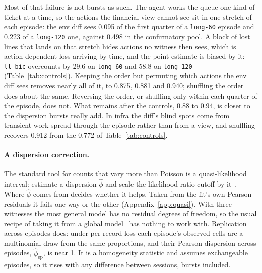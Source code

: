 \documentclass[11pt]{article}
\begin{document}
\begin{table}[h]
\centering

\caption{Loss in blocks of consecutive actions, exact matching.}
\label{tab:bursts}
\end{table}

Most of that failure is not bursts as such. The agent works the queue one kind of
ticket at a time, so the actions the financial view cannot see sit in one stretch
of each episode: the env diff sees 0.095 of the first quarter of a
\texttt{long-60} episode and 0.223 of a \texttt{long-120} one, against 0.498 in
the confirmatory pool. A block of lost lines that lands on that stretch hides
actions no witness then sees, which is action-dependent loss arriving by time,
and the point estimate is biased by it: \texttt{ll\_bic} overcounts by 29.6 on
\texttt{long-60} and 58.8 on \texttt{long-120} (Table~\ref{tab:controls}).
Keeping the order but permuting which actions the env diff sees removes nearly
all of it, to 0.875, 0.881 and 0.940; shuffling the order does about the same.
Reversing the order, or shuffling only within each quarter of the episode, does
not. What remains after the controls, 0.88 to 0.94, is closer to the dispersion
bursts really add. In infra the diff's blind spots come from transient work spread
through the episode rather than from a view, and shuffling recovers 0.912 from the
0.772 of Table~\ref{tab:controls}.

\begin{table}[h]
\centering

\caption{What makes block loss fail, on its own loss seeds (Table~\ref{tab:burstseeds}).
Post hoc.}
\label{tab:controls}
\end{table}

\paragraph{A dispersion correction.}
The standard tool for counts that vary more than Poisson is a quasi-likelihood
interval: estimate a dispersion $\hat\phi$ and scale the likelihood-ratio cutoff
by it~\citep{wedderburn1974quasi,mccullagh1989glm}. Where $\hat\phi$ comes from
decides whether it helps. Taken from the fit's own Pearson residuals it fails one
way or the other (Appendix~\ref{app:quasi}). With three witnesses the most
general model has no residual degrees of freedom, so the usual recipe of taking
it from a global model~\citep{lebreton1992marked,burnham2002model} has nothing to
work with. Replication across episodes does: under per-record loss each episode's
observed cells are a multinomial draw from the same proportions, and their
Pearson dispersion across episodes, $\hat\phi_{\mathrm{ep}}$, is near 1. It is a
homogeneity statistic and assumes exchangeable episodes, so it rises with any
difference between sessions, bursts included.
\end{document}
